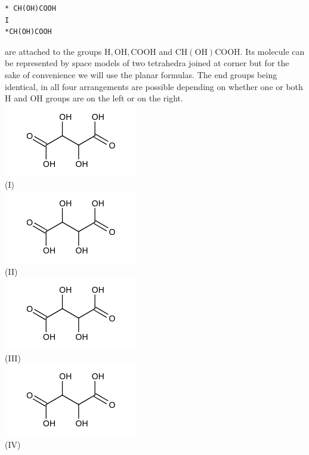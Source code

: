 \documentclass[10pt]{article}
\begin{document}
\begin{verbatim}
* CH(OH)COOH
I
*CH(OH)COOH
\end{verbatim}

are attached to the groups $\mathrm{H}, \mathrm{OH}, \mathrm{COOH}$ and $\mathrm{CH}(\mathrm{OH}) \mathrm{COOH}$. Its molecule can be represented by space models of two tetrahedra joined at corner but for the sake of convenience we will use the planar formulas. The end groups being identical, in all four arrangements are possible depending on whether one or both H and OH groups are on the left or on the right.\\
\includegraphics{smile-5e1b7793ab968f44887fed2808cc3c969150e161}\\
(I)\\
\includegraphics{smile-97c8d1ab8f30a745d5edcf615141b62e70cbb9e7}\\
(II)\\
\includegraphics{smile-23a07e25af96067aca62f27e6d4a6ace5a7c8064}\\
(III)\\
\includegraphics{smile-7d1899657ff534effd9eb0ecf6f1d1a09819bed9}\\
(IV)
\end{document}
